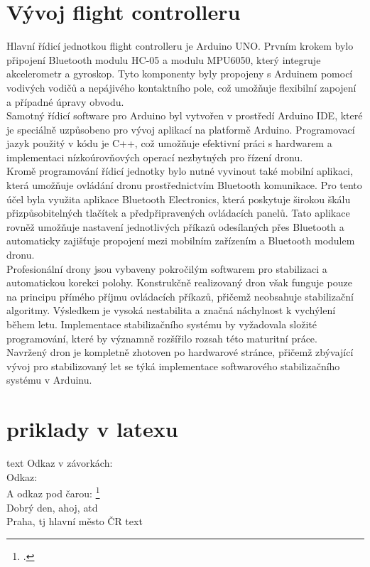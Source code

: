 \documentclass[12pt]{report}
\begin{document}
\chapter[Vývoj flight controlleru]{Vývoj flight controlleru}
Hlavní řídicí jednotkou flight controlleru je Arduino UNO. Prvním krokem bylo připojení Bluetooth modulu HC-05 a modulu MPU6050, který integruje akcelerometr a gyroskop. Tyto komponenty byly propojeny s Arduinem pomocí vodivých vodičů a nepájivého kontaktního pole, což umožňuje flexibilní zapojení a případné úpravy obvodu.\\
Samotný řídicí software pro Arduino byl vytvořen v prostředí Arduino IDE, které je speciálně uzpůsobeno pro vývoj aplikací na platformě Arduino. Programovací jazyk použitý v kódu je C++, což umožňuje efektivní práci s hardwarem a implementaci nízkoúrovňových operací nezbytných pro řízení dronu.\\
Kromě programování řídicí jednotky bylo nutné vyvinout také mobilní aplikaci, která umožňuje ovládání dronu prostřednictvím Bluetooth komunikace. Pro tento účel byla využita aplikace Bluetooth Electronics, která poskytuje širokou škálu přizpůsobitelných tlačítek a předpřipravených ovládacích panelů. Tato aplikace rovněž umožňuje nastavení jednotlivých příkazů odesílaných přes Bluetooth a automaticky zajišťuje propojení mezi mobilním zařízením a Bluetooth modulem dronu.\\
Profesionální drony jsou vybaveny pokročilým softwarem pro stabilizaci a automatickou korekci polohy. Konstrukčně realizovaný dron však funguje pouze na principu přímého příjmu ovládacích příkazů, přičemž neobsahuje stabilizační algoritmy. Výsledkem je vysoká nestabilita a značná náchylnost k vychýlení během letu. Implementace stabilizačního systému by vyžadovala složité programování, které by významně rozšířilo rozsah této maturitní práce.\\
Navržený dron je kompletně zhotoven po hardwarové stránce, přičemž zbývající vývoj pro stabilizovaný let se týká implementace softwarového stabilizačního systému v Arduinu.



\chapter{priklady v latexu}
text
Odkaz v závorkách: \parencite[see][page 900]{einstein}\\
Odkaz: \cite{knuthwebsite}\\
A odkaz pod čarou: \footcite[see][s. 42]{latexcompanion}\\
Dobrý den, ahoj, \gls{atd}\\
Praha, \gls{tj} hlavní město ČR
text
\end{document}

